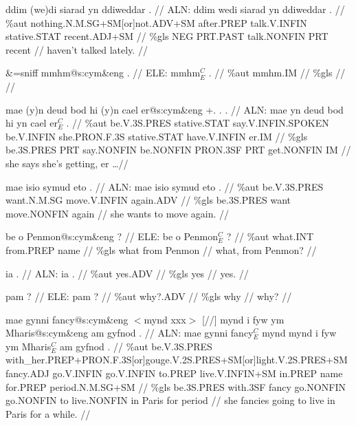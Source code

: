 \documentclass[a4paper,10pt]{article}
\begin{document}
\ex
\begingl[lingstyle=gergl]
\glchat ddim (we)di siarad yn ddiweddar . //
\glsurface ALN:  ddim wedi siarad yn ddiweddar .  //
\glauto \%aut  nothing{\scriptsize .N.M.SG+SM[or]not.ADV+SM} after{\scriptsize .PREP} talk{\scriptsize .V.INFIN} stative{\scriptsize .STAT} recent{\scriptsize .ADJ+SM}   //
\glmanual \%gls  NEG PRT{\scriptsize .PAST} talk{\scriptsize .NONFIN} PRT recent   //
\gleng haven't talked lately. //
\endgl
\xe

\ex
\begingl[lingstyle=gergl]
\glchat \&=sniff mmhm@s:cym\&eng . //
\glsurface ELE:  mmhm$^{C}_{E}$ .  //
\glauto \%aut  mmhm{\scriptsize .IM}   //
\glmanual \%gls     //
\gleng  //
\endgl
\xe

\ex
\begingl[lingstyle=gergl]
\glchat mae (y)n deud bod hi (y)n cael er@s:cym\&eng +. . . //
\glsurface ALN:  mae yn deud bod hi yn cael er$^{C}_{E}$ .  //
\glauto \%aut  be{\scriptsize .V.3S.PRES} stative{\scriptsize .STAT} say{\scriptsize .V.INFIN.SPOKEN} be{\scriptsize .V.INFIN} she{\scriptsize .PRON.F.3S} stative{\scriptsize .STAT} have{\scriptsize .V.INFIN} er{\scriptsize .IM}   //
\glmanual \%gls  be{\scriptsize .3S.PRES} PRT say{\scriptsize .NONFIN} be{\scriptsize .NONFIN} PRON{\scriptsize .3SF} PRT get{\scriptsize .NONFIN} IM   //
\gleng she says she's getting, er \dots  //
\endgl
\xe

\ex
\begingl[lingstyle=gergl]
\glchat mae isio symud eto . //
\glsurface ALN:  mae isio symud eto .  //
\glauto \%aut  be{\scriptsize .V.3S.PRES} want{\scriptsize .N.M.SG} move{\scriptsize .V.INFIN} again{\scriptsize .ADV}   //
\glmanual \%gls  be{\scriptsize .3S.PRES} want move{\scriptsize .NONFIN} again   //
\gleng she wants to move again. //
\endgl
\xe

\ex
\begingl[lingstyle=gergl]
\glchat be o Penmon@s:cym\&eng ? //
\glsurface ELE:  be o Penmon$^{C}_{E}$ ?  //
\glauto \%aut  what{\scriptsize .INT} from{\scriptsize .PREP} name   //
\glmanual \%gls  what from Penmon   //
\gleng what, from Penmon? //
\endgl
\xe

\ex
\begingl[lingstyle=gergl]
\glchat ia . //
\glsurface ALN:  ia .  //
\glauto \%aut  yes{\scriptsize .ADV}   //
\glmanual \%gls  yes   //
\gleng yes. //
\endgl
\xe

\ex
\begingl[lingstyle=gergl]
\glchat pam ? //
\glsurface ELE:  pam ?  //
\glauto \%aut  why?.ADV   //
\glmanual \%gls  why   //
\gleng why? //
\endgl
\xe

\ex
\begingl[lingstyle=gergl]
\glchat mae gynni fancy@s:cym\&eng $<$mynd xxx$>$ [//] mynd i fyw ym Mharis@s:cym\&eng am gyfnod . //
\glsurface ALN:  mae gynni fancy$^{C}_{E}$ mynd mynd i fyw ym Mharis$^{C}_{E}$ am gyfnod .  //
\glauto \%aut  be{\scriptsize .V.3S.PRES} with\_her{\scriptsize .PREP+PRON.F.3S[or]gouge.V.2S.PRES+SM[or]light.V.2S.PRES+SM} fancy{\scriptsize .ADJ} go{\scriptsize .V.INFIN} go{\scriptsize .V.INFIN} to{\scriptsize .PREP} live{\scriptsize .V.INFIN+SM} in{\scriptsize .PREP} name for{\scriptsize .PREP} period{\scriptsize .N.M.SG+SM}   //
\glmanual \%gls  be{\scriptsize .3S.PRES} with{\scriptsize .3SF} fancy go{\scriptsize .NONFIN} go{\scriptsize .NONFIN} to live{\scriptsize .NONFIN} in Paris for period   //
\gleng she fancies going to live in Paris for a while. //
\endgl
\xe
\end{document}
